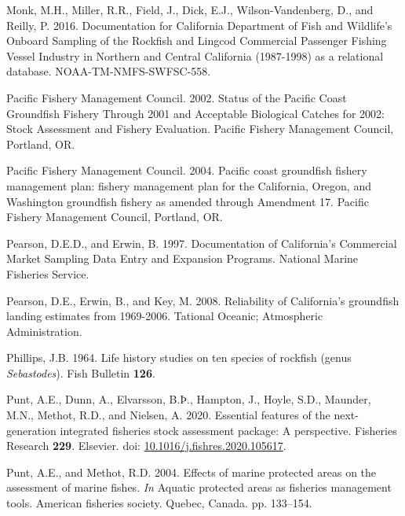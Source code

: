 \documentclass[
  english,
  a4paper,
]{article}
\newlength{\cslhangindent}
\newlength{\cslentryspacingunit} %
\newenvironment{CSLReferences}[2] %
 {%
  \setlength{\parindent}{0pt}
  \ifodd #1
  \let\oldpar\par
  \def\par{\hangindent=\cslhangindent\oldpar}
  \fi
  \setlength{\parskip}{#2\cslentryspacingunit}
 }%
 {}
\begin{document}
\begin{CSLReferences}{1}{0}
\leavevmode{}%
Monk, M.H., Miller, R.R., Field, J., Dick, E.J., Wilson-Vandenberg, D., and Reilly, P. 2016. {Documentation for California Department of Fish and Wildlife's Onboard Sampling of the Rockfish and Lingcod Commercial Passenger Fishing Vessel Industry in Northern and Central California (1987-1998) as a relational database}. NOAA-TM-NMFS-SWFSC-558.

\leavevmode{}%
Pacific Fishery Management Council. 2002. {Status of the Pacific Coast Groundfish Fishery Through 2001 and Acceptable Biological Catches for 2002: Stock Assessment and Fishery Evaluation.} Pacific Fishery Management Council, Portland, OR.

\leavevmode{}%
Pacific Fishery Management Council. 2004. {Pacific coast groundfish fishery management plan: fishery management plan for the California, Oregon, and Washington groundfish fishery as amended through Amendment 17}. Pacific Fishery Management Council, Portland, OR.

\leavevmode{}%
Pearson, D.E.D., and Erwin, B. 1997. {Documentation of California's Commercial Market Sampling Data Entry and Expansion Programs}. National Marine Fisheries Service.

\leavevmode{}%
Pearson, D.E., Erwin, B., and Key, M. 2008. {Reliability of California's groundfish landing estimates from 1969-2006}. Tational Oceanic; Atmospheric Administration.

\leavevmode{}%
Phillips, J.B. 1964. {Life history studies on ten species of rockfish (genus \emph{Sebastodes})}. Fish Bulletin \textbf{126}.

\leavevmode{}%
Punt, A.E., Dunn, A., Elvarsson, B.Þ., Hampton, J., Hoyle, S.D., Maunder, M.N., Methot, R.D., and Nielsen, A. 2020. {Essential features of the next-generation integrated fisheries stock assessment package: A perspective}. Fisheries Research \textbf{229}. Elsevier. doi: \href{https://doi.org/10.1016/j.fishres.2020.105617}{10.1016/j.fishres.2020.105617}.

\leavevmode{}%
Punt, A.E., and Methot, R.D. 2004. {Effects of marine protected areas on the assessment of marine fishes}. \emph{In} Aquatic protected areas as fisheries management tools. American fisheries society. Quebec, Canada. pp. 133--154.


\end{CSLReferences}
\end{document}
